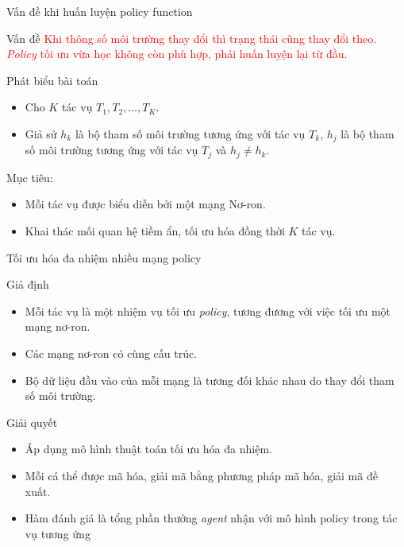 	\begin{frame}{Vấn đề khi huấn luyện policy function}
	    \begin{itemize}
	    \begin{block}{Vấn đề}
	    \textcolor{red}{Khi thông số môi trường thay đổi thì trạng thái cũng thay đổi theo. \emph{Policy} tối ưu vừa học không còn phù hợp, phải huấn luyện lại từ đầu.}
	    \end{block}
	    \begin{block}{Phát biểu bài toán}
	        \begin{itemize}
    		    \setlength\itemsep{0.01em}
    		    \item Cho $K$ tác vụ $T_1, T_2, ..., T_K$.
    		    \item Giả sử $h_k$ là bộ tham số môi trường tương ứng với tác vụ $T_k$, $h_j$ là bộ tham số môi trường tương ứng với tác vụ $T_j$ và $h_j \neq h_k$.
    		    \end{itemize}
    		    Mục tiêu: 
    		    \begin{itemize}
    		        \item Mỗi tác vụ được biểu diễn bởi một mạng Nơ-ron.
    		        \item Khai thác mối quan hệ tiềm ẩn, tối ưu hóa đồng thời $K$ tác vụ.
    		    \end{itemize}
	    \end{block}
	    \end{itemize}
	\end{frame}
	
	\begin{frame}{Tối ưu hóa đa nhiệm nhiều mạng policy}
	    \begin{itemize}
    	    \begin{block}{Giả định}
    	    \begin{itemize}
    	        \item Mỗi tác vụ là một nhiệm vụ tối ưu \emph{policy}, tương đương với việc tối ưu một mạng nơ-ron.
    	        \item Các mạng nơ-ron có cùng cấu trúc.
    	        \item Bộ dữ liệu đầu vào của mỗi mạng là tương đối khác nhau do thay đổi tham số môi trường.
    	    \end{itemize}
    	    \end{block}
    	    \begin{block}{Giải quyết}
    	    \begin{itemize}
    	        \item Áp dụng mô hình thuật toán tối ưu hóa đa nhiệm.
    	        \item Mỗi cá thể được mã hóa, giải mã bằng phương pháp mã hóa, giải mã đề xuất.
    	        \item Hàm đánh giá là tổng phần thưởng \emph{agent} nhận với mô hình policy trong tác vụ tương ứng
    	    \end{itemize}
    	    \end{block}
	    \end{itemize}
	\end{frame}
	
